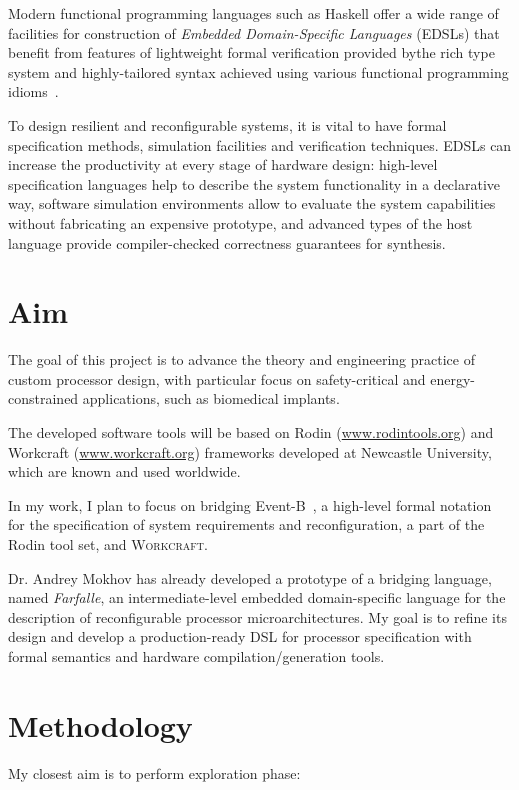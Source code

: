 \documentclass[12pt, a4paper]{article}
\begin{document}
Modern functional programming languages such as Haskell offer a wide range of
facilities for construction of \emph{Embedded Domain-Specific Languages} (EDSLs)
that benefit from features of lightweight formal verification provided bythe
rich type system and highly-tailored syntax achieved using various functional
programming idioms~\cite{HudakDSLs}.

To design resilient and reconfigurable systems, it is vital to have formal
specification methods, simulation facilities and verification techniques.
EDSLs can increase the productivity at every stage of hardware design:
high-level specification
languages help to describe the system functionality in a declarative way,
software simulation environments allow to evaluate the system capabilities
without fabricating an expensive prototype, and advanced types of the host
language provide compiler-checked correctness guarantees for synthesis.

\section{Aim} 

The goal of this project is to advance the theory and
engineering practice of custom processor design, with
particular focus on safety-critical and energy-constrained
applications, such as biomedical implants.

The developed software tools will be based on Rodin 
(\url{www.rodintools.org}) and Workcraft 
(\url{www.workcraft.org}) frameworks developed at Newcastle University, 
which are known and used worldwide.

In my work, I plan to focus on bridging Event-B~\cite{EventB}, 
a high-level formal notation for the specification of system requirements 
and reconfiguration, a part of the Rodin tool set, 
and \textsc{Workcraft}. 

Dr. Andrey Mokhov has already developed a prototype of a bridging language, 
named \emph{Farfalle}, an intermediate-level embedded domain-specific language
for the description of reconfigurable processor microarchitectures. 
My goal is to refine its design and develop a production-ready DSL for processor
specification with formal semantics and hardware compilation/generation tools.

\section{Methodology}

My closest aim is to perform exploration phase: 
\end{document}

